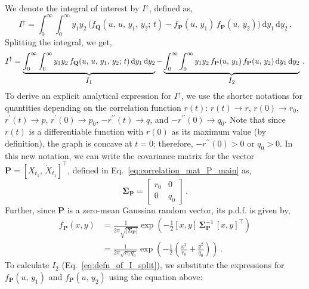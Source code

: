 \documentclass[journal]{IEEEtran}
\theoremstyle{plain}
\theoremstyle{definition}
\theoremstyle{remark}
\newcommand{\Iup}{I^\uparrow}
\newcommand{\dd}{\mathrm{d}}
\newcommand{\rp}{r^\prime}
\newcommand{\rpp}{r^{\prime\prime}}
\begin{document}
We denote the integral of interest by $\Iup$, defined as,
\begin{equation}
    \Iup = \int_{0}^\infty \int_{0}^\infty y_1 y_2 \,\bigl( f_{\mathbf{Q}}(u, \,u, \,y_1, \,y_2; \, t) - f_{\mathbf{P}}(u,\,y_1) \, f_{\mathbf{P}}(u,\,y_2)\bigr)\, \dd y_1 \, \dd y_2 \,. \label{eq:defn_of_I}
\end{equation}
Splitting the integral, we get,
\begin{equation}
    \Iup = \underbrace{\int_{0}^\infty \int_{0}^\infty y_1 y_2 \,f_{\mathbf{Q}}(u, \,u, \,y_1, \,y_2; \, t) \, \dd y_1 \, \dd y_2}_{\text{\normalsize \(I_1\)}} - \underbrace{\int_{0}^\infty \int_{0}^\infty y_1 y_2 \, f_{\mathbf{P}}(u,\,y_1) \, f_{\mathbf{P}}(u,\,y_2) \, \dd y_1 \, \dd y_2}_{\text{\normalsize \(I_2\)}} \,.
\label{eq:defn_of_I_split}
\end{equation}
To derive an explicit analytical expression for $\Iup$, we use the shorter notations for quantities depending on the correlation function $r(t)$: $r(t)\rightarrow r$, $r(0)\rightarrow r_0$, $\rp(t) \rightarrow p$, $\rp(0)\rightarrow p_0$, $-\rpp(t) \rightarrow q$, and $-\rpp(0)\rightarrow q_0$. Note that since $r(t)$ is a differentiable function with $r(0)$ as its maximum value (by definition), the graph is concave at $t=0$; therefore, $-\rpp(0)>0$ or $q_0>0$. In this new notation, we can write the covariance matrix for the vector $\mathbf{P} = [X_{t_1}, \, \dot{X}_{t_1}]^\top$, defined in Eq.~\eqref{eq:correlation_mat_P_main} as,
\begin{equation}
\renewcommand{\arraystretch}{0.75}
    \boldsymbol{\Sigma}_{\mathbf{P}} = \begin{bmatrix}
                r_0 & 0 \\
                0 & q_0
                \end{bmatrix}\,.
\end{equation}
Further, since $\mathbf{P}$ is a zero-mean Gaussian random vector, its p.d.f. is given by,
\begin{equation}
\begin{split}
    f_{\mathbf{P}}(x,y) &= \frac{1}{2\pi \sqrt{\left|\boldsymbol{\Sigma}_{\mathbf{P}}\right|}}\exp\left(-\frac{1}{2}[x, y] \, \boldsymbol{\Sigma}_{\mathbf{P}}^{-1} \, [x, y]^\top\right) \\
    &= \frac{1}{2\pi \sqrt{r_0 \, q_0}}\exp\left(-\frac{1}{2}\left(\frac{x^2}{r_0} + \frac{y^2}{q_0}\right)\right)  \,.
\end{split} \label{eq:f_P_proof}
\end{equation}
To calculate $I_2$ (Eq.~\eqref{eq:defn_of_I_split}), we substitute the expressions for $f_{\mathbf{P}}(u,\,y_1)$ and $f_{\mathbf{P}}(u,\,y_2)$ using the equation above:
\end{document}
